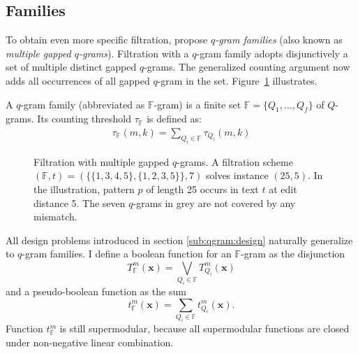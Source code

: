 \subsection{Families}

To obtain even more specific filtration, \cite{Kucherov2005} propose \emph{$q$-gram families} (also known as \emph{multiple gapped $q$-grams}).
Filtration with a $q$-gram family adopts disjunctively a set of multiple distinct gapped $q$-grams.
The generalized counting argument now adds all occurrences of all gapped $q$-gram in the set.
Figure~\ref{fig:qgrams-multiple} illustrates.
\begin{definition}
A $q$-gram family (abbreviated as $\mathbb{F}$-gram) is a finite set $\mathbb{F} = \{ Q_1, \dots, Q_f \}$ of $Q$-grams.
Its counting threshold $\tau_{\mathbb{F}}$ is defined as:
\begin{eqnarray}
\tau_{\mathbb{F}}(m,k) = \sum_{Q_i \in \mathbb{F}}{\tau_{Q_i}(m,k)}
\end{eqnarray}
\end{definition}

\begin{figure}[t]
\begin{center}
\caption[Filtration with multiple gapped $q$-grams]{Filtration with multiple gapped $q$-grams. A filtration scheme $(\mathbb{F},t) = (\{ \{1, 3, 4, 5\}, \{1, 2, 3, 5\} \},7)$ solves instance $(25,5)$. In the illustration, pattern $p$ of length 25 occurs in text $t$ at edit distance 5. The seven $q$-grams in grey are not covered by any mismatch.}
\label{fig:qgrams-multiple}

\end{center}
\end{figure}

All design problems introduced in section \ref{sub:qgram:design} naturally generalize to $q$-gram families.
I define a boolean function for an $\mathbb{F}$-gram as the disjunction
\begin{equation}
\label{eq:family-bool}
T_{\mathbb{F}}^{m}(\mathbf{x}) = \bigvee_{Q_i \in \mathbb{F}} T_{Q_i}^{m}(\mathbf{x})
\end{equation}
and a pseudo-boolean function as the sum
\begin{equation}
\label{eq:family-pseudo}
t_{\mathbb{F}}^{m}(\mathbf{x}) = \sum_{Q_i \in \mathbb{F}} t_{Q_i}^{m}(\mathbf{x}).
\end{equation}
Function $t_{\mathbb{F}}^{m}$ is still supermodular, because all supermodular functions are closed under non-negative linear combination.


